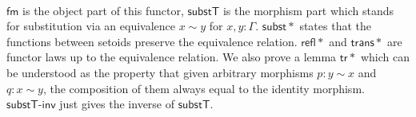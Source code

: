 \begin{code}
\\
\>[2]\<[10]%
\>[10]\AgdaSymbol{\{} \AgdaSymbol{:} \AgdaFunction{[}  \AgdaFunction{]}   \AgdaSymbol{\}}\<%
\\
\>[2]\<[10]%
\>[10]\AgdaSymbol{\{} \AgdaSymbol{:}    \AgdaSymbol{\}}  \<[27]%
\>[27]\<%
\\
\>[2]\<[10]%
\>[10]\AgdaFunction{[}   \AgdaFunction{]}   \AgdaSymbol{(}  \AgdaSymbol{)}  \<%
\\
\>[0]\<[2]%
\>[2] \AgdaSymbol{=} \AgdaFunction{[}  \AgdaSymbol{\_} \AgdaFunction{]trans} \AgdaSymbol{(} \AgdaSymbol{\_)} \<%
\\
%
\\
\>[0]\<[2]%
\>[2] \AgdaSymbol{:} \AgdaSymbol{\{}  \AgdaSymbol{:}   \AgdaSymbol{\}}  \<[31]%
\>[31]\<%
\\
\>[2]\<[13]%
\>[13]\AgdaFunction{[}  \AgdaFunction{]}   \AgdaSymbol{)} \<%
\\
\>[2]\<[13]%
\>[13]     \<[24]%
\>[24]\<%
\\
\>[2]\<[13]%
\>[13]   \<%
\\
\>[0]\<[2]%
\>[2]   \AgdaSymbol{=}  \AgdaSymbol{(}\AgdaFunction{[}  \AgdaFunction{]sym} \AgdaSymbol{)} \<%
\\
\>\<\end{code}

$\mathsf{fm}$ is the object part of this functor, $\mathsf{substT}$ is the morphism part which stands for substitution via an equivalence $x \sim y$ for $x , y : \Gamma$. $\mathsf{subst*}$ states that the functions between setoids preserve the equivalence relation. $\mathsf{refl*}$ and $\mathsf{trans*}$ are functor laws up to the equivalence relation. We also prove a lemma $\mathsf{tr*}$ which can be understood as the property that given arbitrary morphisms $p : y \sim x$ and $q : x \sim y$, the composition of them always equal to the identity morphism. $\mathsf{substT\text{-}inv}$ just gives the inverse of $\mathsf{substT}$.

